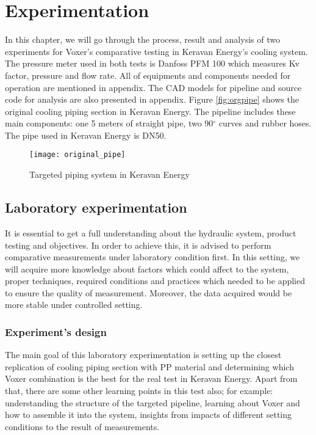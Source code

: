 
\chapter{Experimentation}

In this chapter, we will go through the process, result and analysis of two experiments for Voxer's comparative testing in Keravan Energy's cooling system. The pressure meter used in both tests is Danfoss PFM 100 \cite{danfoss:web} which measures Kv factor, pressure and flow rate. All of equipments and components needed for operation are mentioned in appendix. The CAD models for pipeline and source code for analysis are also presented in appendix. Figure \vref{fig:orgpipe} shows the original cooling piping section in Keravan Energy. The pipeline includes these main components: one 5 meters of straight pipe, two 90$^{\circ}$ curves and rubber hoses. The pipe used in Keravan Energy is DN50.

\begin{figure}[h]
  \centering
  \texttt{[image: original\_pipe]}
  \caption{ Targeted piping system in Keravan Energy}
  \label{fig:orgpipe}
\end{figure}

\section{Laboratory experimentation}

It is essential to get a full understanding about the hydraulic system, product testing and objectives. In order to achieve this, it is advised to perform comparative measurements under laboratory condition first. In this setting, we will acquire more knowledge about factors which could affect to the system, proper techniques, required conditions and practices which needed to be applied to ensure the quality of measurement. Moreover, the data acquired would be more stable under controlled setting.

\subsection{Experiment's design}

The main goal of this laboratory experimentation is setting up the closest replication of cooling piping section with PP material and determining which Voxer combination is the best for the real test in Keravan Energy. Apart from that, there are some other learning points in this test also; for example: understanding the structure of the targeted pipeline, learning about Voxer and how to assemble it into the system, insights from impacts of different setting conditions to the result of measurements.


